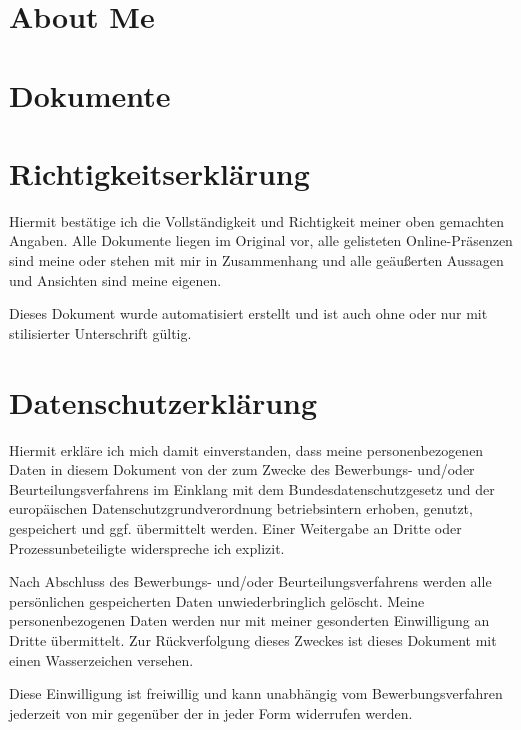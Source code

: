 ﻿\documentclass[
	a4paper,
	fontsize=12
]{scrartcl}
\begin{document}
\endgroup %

\section{About Me}
\RecpSalutation
\bigskip

\CVAboutMe
\newpage


\section{Dokumente}

\newcommand{\RemainingPageHeight}{\dimexpr\pagegoal-\pagetotal-\baselineskip\relax}

\newcommand{\PageFillImage}[1]{%
	\begin{minipage}[b]{\textwidth}
		\center\fcolorbox{RoyalBlue}{white}{
			\texttt{[image: \\CVDataPath/\#1]}
		}
	\end{minipage}
	\newpage
}%

\CVDocs

\section{Richtigkeitserklärung}
Hiermit bestätige ich die Vollständigkeit und Richtigkeit meiner oben gemachten
Angaben. Alle Dokumente liegen im Original vor, alle gelisteten Online-Präsenzen
sind meine oder stehen mit mir in Zusammenhang und alle geäußerten Aussagen
und Ansichten sind meine eigenen.

Dieses Dokument wurde automatisiert erstellt und ist auch ohne oder nur mit
stilisierter Unterschrift gültig.

\section{Datenschutzerklärung}
Hiermit erkläre ich mich damit einverstanden, dass meine personenbezogenen Daten
in diesem Dokument von der \RecpCompany{} zum Zwecke des Bewerbungs- und/oder
Beurteilungsverfahrens im Einklang mit dem Bundesdatenschutzgesetz und der
europäischen Datenschutzgrundverordnung betriebsintern erhoben, genutzt,
gespeichert und ggf. übermittelt werden.
Einer Weitergabe an Dritte oder Prozessunbeteiligte widerspreche ich explizit.

Nach Abschluss des Bewerbungs- und/oder Beurteilungsverfahrens werden alle
persönlichen gespeicherten Daten unwiederbringlich gelöscht.
Meine personenbezogenen Daten werden nur mit meiner gesonderten Einwilligung
an Dritte übermittelt. Zur Rückverfolgung dieses Zweckes ist dieses Dokument
mit einen Wasserzeichen versehen.

Diese Einwilligung ist freiwillig und kann unabhängig vom Bewerbungsverfahren
jederzeit von mir gegenüber der \RecpCompany{} in jeder Form widerrufen werden.
\vfill
\MySignature
\vfill\vfill\vfill
\end{document}

